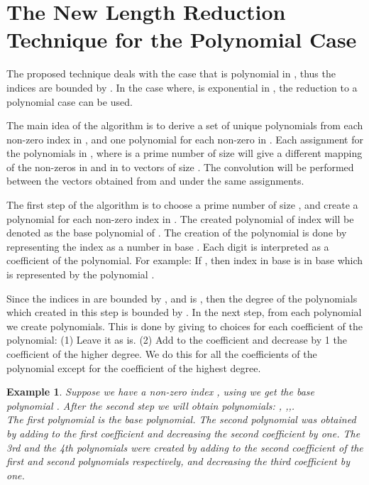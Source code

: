 \documentclass[11pt,amssymb]{article}
\newtheorem{example}{Example}
\begin{document}
\section{The New Length Reduction Technique for the Polynomial
  Case}\label{s:length}

The proposed technique deals with the case that  is polynomial
in , thus the indices are bounded by . In the case
where,  is exponential in , the reduction to a polynomial
case can be used.

The main idea of the algorithm is to derive a set of unique polynomials
from each non-zero index in , and one polynomial for each non-zero
in . Each assignment for the polynomials in , where  is a
prime number of size  will give a different mapping of
the non-zeros in  and in  to vectors of size . The
convolution will be performed between the vectors obtained from
 and  under the same assignments.

The first step of the algorithm is to choose a prime number of size
, and create a polynomial for each non-zero index in
. The created polynomial of index  will be denoted as the base
polynomial of . The creation of the polynomial is done by
representing the index as a number in base . Each
digit is interpreted as a coefficient of the polynomial. For example:
If , then index  in base  is  in base  which is represented by the polynomial .

Since the indices in  are bounded by , and  is , then the degree of the polynomials which created in this step
is bounded by . In the next step, from each polynomial we create
 polynomials. This is done by giving to choices for each
coefficient of the polynomial: (1) Leave it as is. (2) Add  to the coefficient and decrease by 1 the coefficient of the
higher degree. We do this for all the coefficients of the polynomial
except for the coefficient of the highest degree.

\begin{example}
Suppose we have a non-zero index , using  we get the base
polynomial . After the second step we will obtain 
polynomials: , ,,.\\
The first polynomial is the base polynomial. The second polynomial was
obtained by adding  to the first coefficient and decreasing the
second coefficient by one. The 3rd and the 4th polynomials were created
by adding  to the second coefficient of the first and second
polynomials respectively, and decreasing the third coefficient by one.
\end{example}
\end{document}
